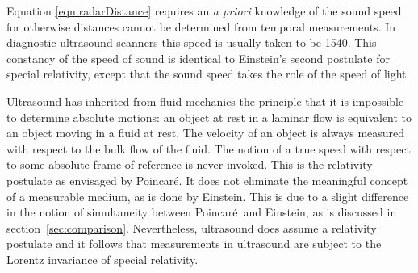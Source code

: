 \documentclass[10pt, fleqn,final,showtrims,oldfontcommands, article,a4paper,oneside]{memoir} %
\newcommand{\secref}[1]{section~\ref{sec:#1}}
\newcommand{\eqnref}[1]{\ref{eqn:#1}}
\newcommand{\Poincare}{Poincar{\'e}}
\begin{document}
Equation \eqnref{radarDistance} requires an {\em a priori} knowledge of the sound speed
for otherwise distances cannot be determined from temporal measurements.
In diagnostic ultrasound scanners this speed is usually taken to be \unit{1540}\metre\reciprocal\second.
This constancy of the speed of sound is identical to Einstein's  second postulate for special relativity\cite{Einstein1905},
except that the sound speed takes the role of the speed of light.

Ultrasound has inherited from fluid mechanics the principle that it is impossible to determine absolute motions:
an object at rest in a laminar flow is equivalent to an object moving in a fluid at rest.
The velocity of an object is always measured with respect to the bulk flow of the fluid.
The notion of a true speed with respect to some absolute frame of reference is never  invoked.
This is the relativity postulate as envisaged by \Poincare.
It does not  eliminate the meaningful concept of a measurable medium,
as is done by Einstein.
This is due to a slight difference in the notion of simultaneity between \Poincare\ and Einstein, 
as is discussed in \secref{comparison}.
Nevertheless, ultrasound does assume a relativity postulate
and it follows that  measurements in ultrasound are subject to the Lorentz invariance of special relativity.


\end{document}
